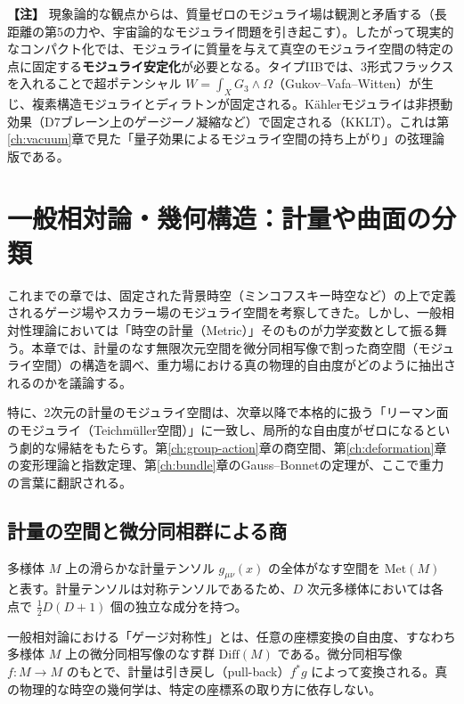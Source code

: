 \documentclass[uplatex, dvipdfmx, book]{jsbook}
\let\origsection\section
\let\origsubsection\subsection
\let\origsubsubsection\subsubsection
\newcommand{\chapter}{\origsection}
\renewcommand{\section}{\origsubsection}
\renewcommand{\subsection}{\origsubsubsection}
\renewcommand{\subsubsection}{\paragraph}
\newenvironment{note}{\vspace{1ex}\par\footnotesize\noindent\textbf{【注】}}{\par\vspace{1ex}}
\begin{document}
\begin{note}
現象論的な観点からは、質量ゼロのモジュライ場は観測と矛盾する（長距離の第5の力や、宇宙論的なモジュライ問題を引き起こす）。したがって現実的なコンパクト化では、モジュライに質量を与えて真空のモジュライ空間の特定の点に固定する\textbf{モジュライ安定化}が必要となる。タイプIIBでは、3形式フラックスを入れることで超ポテンシャル $W = \int_X G_3 \wedge \Omega$（Gukov--Vafa--Witten\cite{gvw2000}）が生じ、複素構造モジュライとディラトンが固定される。K\"ahlerモジュライは非摂動効果（D7ブレーン上のゲージーノ凝縮など）で固定される（KKLT\cite{kklt2003}）。これは第\ref{ch:vacuum}章で見た「量子効果によるモジュライ空間の持ち上がり」の弦理論版である。
\end{note}
\chapter{一般相対論・幾何構造：計量や曲面の分類}
\label{ch:gravity}

これまでの章では、固定された背景時空（ミンコフスキー時空など）の上で定義されるゲージ場やスカラー場のモジュライ空間を考察してきた。しかし、一般相対性理論においては「時空の計量（Metric）」そのものが力学変数として振る舞う。本章では、計量のなす無限次元空間を微分同相写像で割った商空間（モジュライ空間）の構造を調べ、重力場における真の物理的自由度がどのように抽出されるのかを議論する。

特に、2次元の計量のモジュライ空間は、次章以降で本格的に扱う「リーマン面のモジュライ（Teichm\"uller空間）」に一致し、局所的な自由度がゼロになるという劇的な帰結をもたらす。第\ref{ch:group-action}章の商空間、第\ref{ch:deformation}章の変形理論と指数定理、第\ref{ch:bundle}章のGauss--Bonnetの定理が、ここで重力の言葉に翻訳される。

\section{計量の空間と微分同相群による商}

多様体 $M$ 上の滑らかな計量テンソル $g_{\mu\nu}(x)$ の全体がなす空間を $\mathrm{Met}(M)$ と表す。計量テンソルは対称テンソルであるため、$D$ 次元多様体においては各点で $\frac{1}{2}D(D+1)$ 個の独立な成分を持つ。

一般相対論における「ゲージ対称性」とは、任意の座標変換の自由度、すなわち多様体 $M$ 上の微分同相写像のなす群 $\mathrm{Diff}(M)$ である。微分同相写像 $f: M \to M$ のもとで、計量は引き戻し（pull-back）$f^* g$ によって変換される。真の物理的な時空の幾何学は、特定の座標系の取り方に依存しない。
\end{document}
